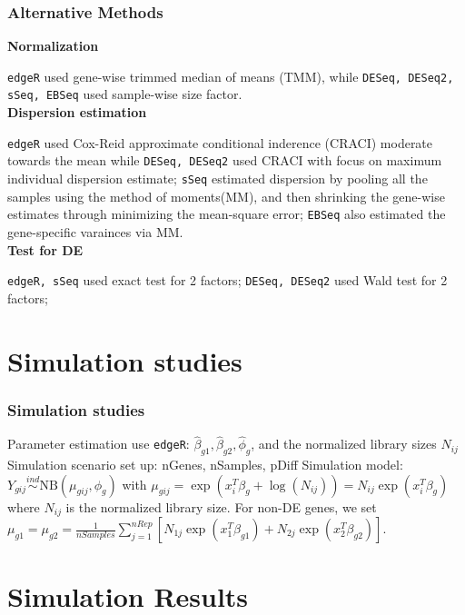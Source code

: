 \documentclass[handout,10pt]{beamer}
\newcommand{\ind}{\stackrel{ind}{\sim}}
\begin{document}
\begin{frame}
\frametitle{Alternative Methods}

\textbf{Normalization}

{\tt edgeR} used gene-wise trimmed median of means (TMM), while {\tt DESeq, DESeq2, sSeq, EBSeq} used sample-wise size factor. \\

\textbf{Dispersion estimation}

{\tt edgeR} used Cox-Reid approximate conditional inderence (CRACI) moderate towards the mean while {\tt DESeq, DESeq2} used CRACI with focus on maximum individual dispersion estimate; {\tt sSeq} estimated dispersion by pooling all the samples using the method of moments(MM), and then shrinking the gene-wise estimates through minimizing the mean-square error; {\tt EBSeq} also estimated the gene-specific varainces via MM. \\


\textbf{Test for DE}

{\tt edgeR, sSeq} used exact test for 2 factors; {\tt DESeq, DESeq2} used Wald test for 2 factors; 

\end{frame}

\section{Simulation studies}


\begin{frame}
\frametitle{Simulation studies}

Parameter estimation use {\tt edgeR}: $\hat{\beta}_{g1}, \hat{\beta}_{g2}, \hat{\phi}_g$, and the normalized library sizes $N_{ij}$
\newline
\newline
Simulation scenario set up: nGenes, nSamples, pDiff
\newline
\newline
Simulation model: $Y_{gij} \ind \text{NB} \left (\mu_{gij}, \phi_g \right )$ with $\mu_{gij} = \exp(x_i^T\beta_g + \log(N_{ij})) = N_{ij}\exp(x_i^T\beta_g)$ where $N_{ij}$ is the normalized library size. For non-DE genes, we set $\mu_{g1} = \mu_{g2} = \frac{1}{nSamples} \sum_{j=1}^{nRep} [N_{1j}\exp(x_1^T\beta_{g1}) + N_{2j}\exp(x_2^T\beta_{g2})]$. 

\end{frame}


\section{Simulation Results}
\end{document}
